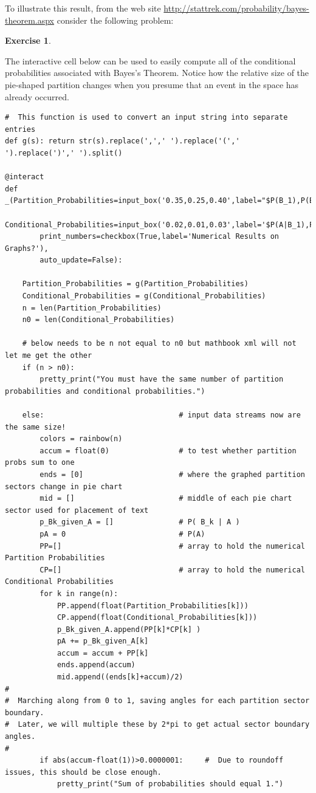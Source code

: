 \documentclass[10pt,]{book}
\theoremstyle{plain}
\theoremstyle{definition}
\theoremstyle{definition}
\theoremstyle{definition}
\newtheorem{exercise}[theorem]{Exercise}
\numberwithin{equation}{section}
\begin{document}
	To illustrate this result, from the web site \url{http://stattrek.com/probability/bayes-theorem.aspx} consider the following problem:
\begin{exercise}\label{exercise-5}
\end{exercise}
\par
The interactive cell below can be used to easily compute all of the conditional probabilities associated with Bayes's Theorem. Notice how the relative size of the pie-shaped partition changes when you presume that an event in the space has already occurred.%
\begin{lstlisting}[style=sageinput]
#  This function is used to convert an input string into separate entries
def g(s): return str(s).replace(',',' ').replace('(',' ').replace(')',' ').split()

@interact
def _(Partition_Probabilities=input_box('0.35,0.25,0.40',label="$P(B_1),P(B_2),...$"),
        Conditional_Probabilities=input_box('0.02,0.01,0.03',label='$P(A|B_1),P(A|B_2),...$'),
        print_numbers=checkbox(True,label='Numerical Results on Graphs?'),
        auto_update=False):
            
    Partition_Probabilities = g(Partition_Probabilities)
    Conditional_Probabilities = g(Conditional_Probabilities)
    n = len(Partition_Probabilities)
    n0 = len(Conditional_Probabilities)
    
    # below needs to be n not equal to n0 but mathbook xml will not let me get the other
    if (n > n0):
        pretty_print("You must have the same number of partition probabilities and conditional probabilities.")
        
    else:                               # input data streams now are the same size!
        colors = rainbow(n)
        accum = float(0)                # to test whether partition probs sum to one
        ends = [0]                      # where the graphed partition sectors change in pie chart 
        mid = []                        # middle of each pie chart sector used for placement of text
        p_Bk_given_A = []               # P( B_k | A )
        pA = 0                          # P(A)
        PP=[]                           # array to hold the numerical Partition Probabilities 
        CP=[]                           # array to hold the numerical Conditional Probabilities     
        for k in range(n):
            PP.append(float(Partition_Probabilities[k]))
            CP.append(float(Conditional_Probabilities[k]))    
            p_Bk_given_A.append(PP[k]*CP[k] )
            pA += p_Bk_given_A[k]
            accum = accum + PP[k]
            ends.append(accum)
            mid.append((ends[k]+accum)/2)
#
#  Marching along from 0 to 1, saving angles for each partition sector boundary.
#  Later, we will multiple these by 2*pi to get actual sector boundary angles.
#
        if abs(accum-float(1))>0.0000001:     #  Due to roundoff issues, this should be close enough.                     
            pretty_print("Sum of probabilities should equal 1.")
        

\end{lstlisting}
\end{document}
